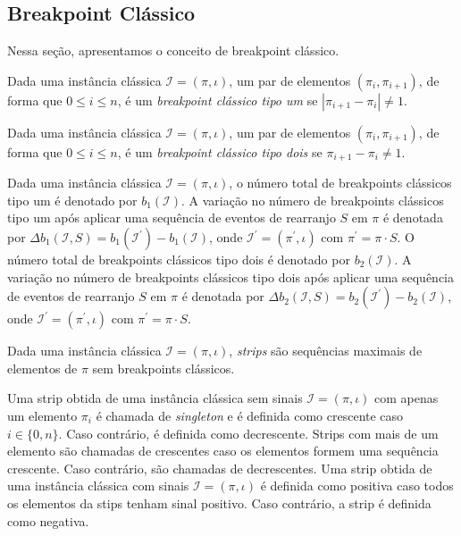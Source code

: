 \subsection{Breakpoint Clássico}

Nessa seção, apresentamos o conceito de breakpoint clássico.

\begin{definition}
  Dada uma instância clássica $\mathcal{I} = (\pi,\iota)$, um par de elementos $(\pi_{i}, \pi_{i+1})$, de forma que $0 \le i \le n$, é um \emph{breakpoint clássico tipo um} se $|\pi_{i+1} - \pi_{i}| \ne 1$.
\end{definition}

\begin{definition}
  Dada uma instância clássica $\mathcal{I} = (\pi,\iota)$, um par de elementos $(\pi_{i}, \pi_{i+1})$, de forma que $0 \le i \le n$, é um \emph{breakpoint clássico tipo dois} se $\pi_{i+1} - \pi_{i} \ne 1$.
\end{definition}

Dada uma instância clássica $\mathcal{I} = (\pi,\iota)$, o número total de breakpoints clássicos tipo um é denotado por $b_{1}(\mathcal{I})$. A variação no número de breakpoints clássicos tipo um após aplicar uma sequência de eventos de rearranjo $S$ em $\pi$ é denotada por  $\Delta b_1(\mathcal{I},S) = b_1(\mathcal{I}^{\prime}) - b_1(\mathcal{I})$, onde $\mathcal{I}^{\prime} = (\pi^{\prime},\iota)$ com $\pi^{\prime} = \pi \cdot S$. O número total de breakpoints clássicos tipo dois é denotado por $b_{2}(\mathcal{I})$. A variação no número de breakpoints clássicos tipo dois após aplicar uma sequência de eventos de rearranjo $S$ em $\pi$ é denotada por $\Delta b_2(\mathcal{I},S) = b_2(\mathcal{I}^{\prime}) - b_2(\mathcal{I})$, onde $\mathcal{I}^{\prime} = (\pi^{\prime},\iota)$ com $\pi^{\prime} = \pi \cdot S$.

\begin{definition}
  Dada uma instância clássica $\mathcal{I} = (\pi,\iota)$, \emph{strips} são sequências maximais de elementos de $\pi$ sem breakpoints clássicos.
\end{definition}

Uma strip obtida de uma instância clássica sem sinais $\mathcal{I} = (\pi,\iota)$ com apenas um elemento $\pi_i$ é chamada de \emph{singleton} e é definida como crescente caso  $i \in \{0,n\}$. Caso contrário, é definida como decrescente. Strips com mais de um elemento são chamadas de crescentes caso os elementos formem uma sequência crescente. Caso contrário, são chamadas de decrescentes. Uma strip obtida de uma instância clássica com sinais $\mathcal{I} = (\pi,\iota)$ é definida como positiva caso todos os elementos da stips tenham sinal positivo. Caso contrário, a strip é definida como negativa.

